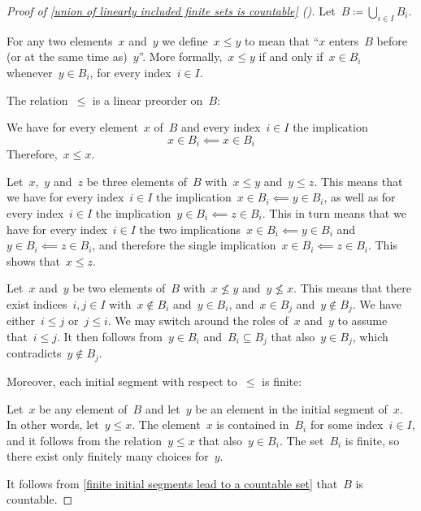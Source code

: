 \begin{proof}[Proof of \cref{union of linearly included finite sets is countable} (\cite{stackexchange_linearly_ordered_union_is_countable})]
	Let~$B ≔ ⋃_{i ∈ I} B_i$.

	For any two elements~$x$ and~$y$ we define~$x ≤ y$ to mean that \enquote{$x$ enters~$B$ before (or at the same time as)~$y$}.
	More formally,~$x ≤ y$ if and only if~$x ∈ B_i$ whenever~$y ∈ B_i$, for every index~$i ∈ I$.

	The relation~$≤$ is a linear preorder on~$B$:
	\begin{itemize*}

		\item
			We have for every element~$x$ of~$B$ and every index~$i ∈ I$ the implication
			\[
				x ∈ B_i \impliedby x ∈ B_i
			\]
			Therefore,~$x ≤ x$.

		\item
			Let~$x$,~$y$ and~$z$ be three elements of~$B$ with~$x ≤ y$ and~$y ≤ z$.
			This means that we have for every index~$i ∈ I$ the implication~$x ∈ B_i \impliedby y ∈ B_i$, as well as for every index~$i ∈ I$ the implication~$y ∈ B_i \impliedby z ∈ B_i$.
			This in turn means that we have for every index~$i ∈ I$ the two implications~$x ∈ B_i \impliedby y ∈ B_i$ and~$y ∈ B_i \impliedby z ∈ B_i$, and therefore the single implication~$x ∈ B_i \impliedby z ∈ B_i$.
			This shows that~$x ≤ z$.

		\item
			Let~$x$ and~$y$ be two elements of~$B$ with~$x ≰ y$ and~$y ≰ x$.
			This means that there exist indices~$i, j ∈ I$ with~$x ∉ B_i$ and~$y ∈ B_i$, and~$x ∈ B_j$ and~$y ∉ B_j$.
			We have either~$i ≤ j$ or~$j ≤ i$.
			We may switch around the roles of~$x$ and~$y$ to assume that~$i ≤ j$.
			It then follows from~$y ∈ B_i$ and~$B_i ⊆ B_j$ that also~$y ∈ B_j$, which contradicts~$y ∉ B_j$.

	\end{itemize*}
	Moreover, each initial segment with respect to~$≤$ is finite:
	\begin{itemize*}[resume*]

		\item
			Let~$x$ be any element of~$B$ and let~$y$ be an element in the initial segment of~$x$.
			In other words, let~$y ≤ x$.
			The element~$x$ is contained in~$B_i$ for some index~$i ∈ I$, and it follows from the relation~$y ≤ x$ that also~$y ∈ B_i$.
			The set~$B_i$ is finite, so there exist only finitely many choices for~$y$.

	\end{itemize*}
	It follows from \cref{finite initial segments lead to a countable set} that~$B$ is countable.
\end{proof}

